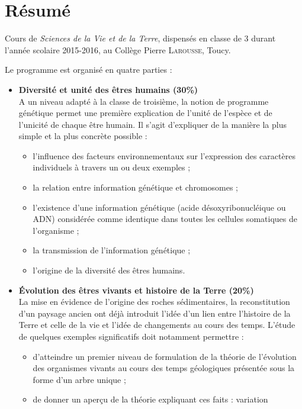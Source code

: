 %
\chapter*{Résumé}
\label{sec:abstract}
\vspace*{-10mm}

Cours de \emph{Sciences de la Vie et de la Terre}, dispensés en classe de 3 durant l'année scolaire 2015-2016, au Collège Pierre \textsc{Larousse}, Toucy.

Le programme est organisé en quatre parties :
\begin{itemize}
\item \textbf{Diversité et unité des êtres humains (30\%)}\\
	A un niveau adapté à la classe de troisième, la notion de programme
génétique permet une première explication de l'unité de l'espèce et de
l'unicité de chaque être humain. Il s'agit d'expliquer de la manière la
plus simple et la plus concrète possible :
	\begin{itemize}
		\item l'influence des facteurs environnementaux sur l'expression des
caractères individuels à travers un ou deux exemples ;
		\item la relation entre information génétique et chromosomes ;
		\item l'existence d'une information génétique (acide désoxyribonucléique
ou ADN) considérée comme identique dans toutes les cellules
somatiques de l'organisme ;
		\item la transmission de l'information génétique ;
		\item l’origine de la diversité des êtres humains. 
	\end{itemize}
\item \textbf{Évolution des êtres vivants et histoire de la Terre (20\%)}\\
La mise en évidence de l'origine des roches sédimentaires, la
reconstitution d'un paysage ancien ont déjà introduit l'idée d'un lien
entre l'histoire de la Terre et celle de la vie et l’idée de changements
au cours des temps. L'étude de quelques exemples significatifs doit
notamment permettre :	
	\begin{itemize}
		\item d’atteindre un premier niveau de formulation de la théorie de
l’évolution des organismes vivants au cours des temps géologiques
présentée sous la forme d’un arbre unique ;
		\item de donner un aperçu de la théorie expliquant ces faits : variation

\end{itemize}
\end{itemize}
